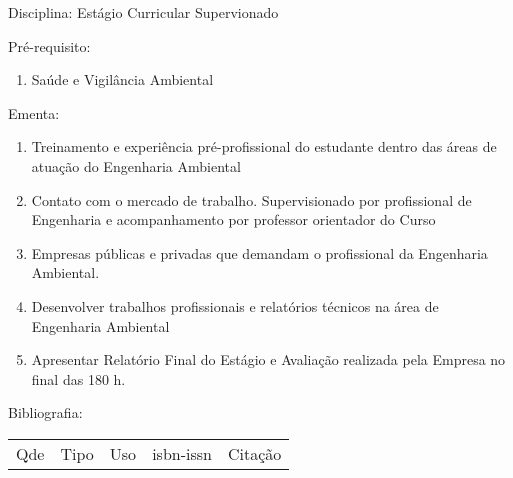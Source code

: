 \documentclass[12pt,a4paper,twoside]{report}
\begin{document}
Disciplina: Estágio Curricular Supervionado

Pré-requisito:
\begin{enumerate}
\item Saúde e Vigilância Ambiental
\end{enumerate}

Ementa:
\begin{enumerate}
\item Treinamento e experiência pré-profissional do estudante  dentro das áreas de atuação do Engenharia Ambiental
\item Contato com o mercado de trabalho. Supervisionado por profissional de Engenharia e acompanhamento por professor orientador do Curso
\item Empresas públicas e privadas que demandam o profissional da Engenharia Ambiental.
\item Desenvolver trabalhos profissionais e relatórios técnicos na área de Engenharia Ambiental
\item Apresentar Relatório Final do Estágio e Avaliação realizada pela Empresa no final das 180 h.
\end{enumerate}

Bibliografia:
\begin{tabular}{lllll}
Qde & Tipo & Uso & isbn-issn & Citação \\
\end{tabular}
\end{document}
